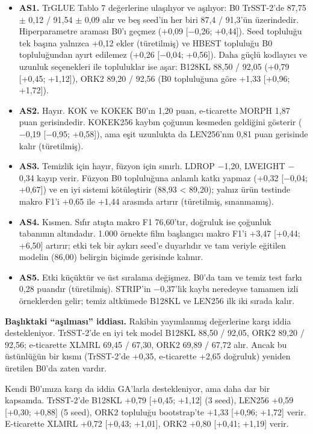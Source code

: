 \documentclass[11pt]{article}
\begin{document}
\begin{itemize}
\item \textbf{AS1.} TrGLUE Tablo 7 değerlerine ulaşılıyor ve aşılıyor: B0 TrSST-2'de 87,75 $\pm$ 0,12 / 91,54 $\pm$ 0,09 alır ve beş seed'in her biri 87,4 / 91,3'ün üzerindedir. Hiperparametre araması B0'ı geçmez (+0,09 [$-$0,26; +0,44]). Seed topluluğu tek başına yalnızca +0,12 ekler (türetilmiş) ve HBEST topluluğu B0 topluluğundan ayırt edilemez (+0,26 [$-$0,04; +0,56]). Daha güçlü kodlayıcı ve uzunluk seçenekleri ile topluluklar ise aşar: B128KL 88,50 / 92,05 (+0,79 [+0,45; +1,12]), ORK2 89,20 / 92,56 (B0 topluluğuna göre +1,33 [+0,96; +1,72]).
\item \textbf{AS2.} Hayır. KOK ve KOKEK B0'ın 1,20 puan, e-ticarette MORPH 1,87 puan gerisindedir. KOKEK256 kaybın çoğunun kesmeden geldiğini gösterir ($-$0,19 [$-$0,95; +0,58]), ama eşit uzunlukta da LEN256'nın 0,81 puan gerisinde kalır (türetilmiş).
\item \textbf{AS3.} Temizlik için hayır, füzyon için sınırlı. LDROP $-$1,20, LWEIGHT $-$0,34 kayıp verir. Füzyon B0 topluluğuna anlamlı katkı yapmaz (+0,32 [$-$0,04; +0,67]) ve en iyi sistemi kötüleştirir (88,93 < 89,20); yalnız ürün testinde makro F1'i +0,65 ile +1,44 arasında artırır (türetilmiş, sınanmamış).
\item \textbf{AS4.} Kısmen. Sıfır atışta makro F1 76,60'tır, doğruluk ise çoğunluk tabanının altındadır. 1.000 örnekte film başlangıcı makro F1'i +3,47 [+0,44; +6,50] artırır; etki tek bir aykırı seed'e duyarlıdır ve tam veriyle eğitilen modelin (86,00) belirgin biçimde gerisinde kalınır.
\item \textbf{AS5.} Etki küçüktür ve üst sıralama değişmez. B0'da tam ve temiz test farkı 0,28 puandır (türetilmiş). STRIP'in $-$0,37'lik kaybı neredeyse tamamen izli örneklerden gelir; temiz altkümede B128KL ve LEN256 ilk iki sırada kalır.
\end{itemize}

\textbf{Başlıktaki ``aşılması'' iddiası.} Rakibin yayımlanmış değerlerine karşı iddia destekleniyor. TrSST-2'de en iyi tek model B128KL 88,50 / 92,05, ORK2 89,20 / 92,56; e-ticarette XLMRL 69,45 / 67,30, ORK2 69,89 / 67,72 alır. Ancak bu üstünlüğün bir kısmı (TrSST-2'de +0,35, e-ticarette +2,65 doğruluk) yeniden üretilen B0'da zaten vardır.

Kendi B0'ımıza karşı da iddia GA'larla destekleniyor, ama daha dar bir kapsamda. TrSST-2'de B128KL +0,79 [+0,45; +1,12] (3 seed), LEN256 +0,59 [+0,30; +0,88] (5 seed), ORK2 topluluğu bootstrap'te +1,33 [+0,96; +1,72] verir. E-ticarette XLMRL +0,72 [+0,43; +1,01], ORK2 +0,80 [+0,41; +1,19] verir.
\end{document}
